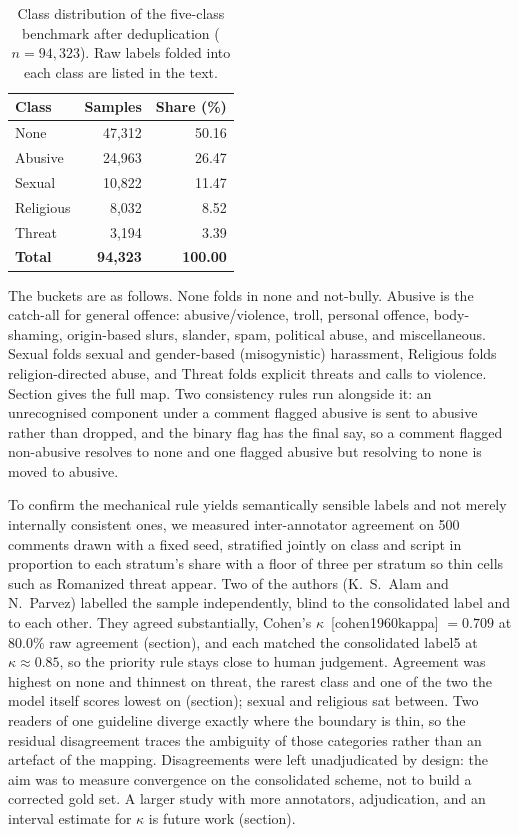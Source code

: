 \documentclass[11pt,a4paper]{article}
\def\citep#1{[#1]}%
\def\Cref#1{Section}%
\def\cref#1{section}%
\def\texttt#1{#1}%
\def\emph#1{#1}%
\begin{document}
\begin{table}[!htbp]
\centering
\caption{Class distribution of the five-class benchmark after deduplication ($n = 94{,}323$). Raw labels folded into each class are listed in the text.}
\label{tab:classes}
\small
\begin{tabular}{@{}lrr@{}}
\toprule
\textbf{Class} & \textbf{Samples} & \textbf{Share (\%)} \\
\midrule
None & 47{,}312 & 50.16 \\
Abusive & 24{,}963 & 26.47 \\
Sexual & 10{,}822 & 11.47 \\
Religious & 8{,}032 & 8.52 \\
Threat & 3{,}194 & 3.39 \\
\midrule
\textbf{Total} & \textbf{94{,}323} & \textbf{100.00} \\
\bottomrule
\end{tabular}
\end{table}

The buckets are as follows. \emph{None} folds in \texttt{none} and \texttt{not-bully}. \emph{Abusive} is the catch-all for general offence: abusive/violence, troll, personal offence, body-shaming, origin-based slurs, slander, spam, political abuse, and miscellaneous. \emph{Sexual} folds sexual and gender-based (misogynistic) harassment, \emph{Religious} folds religion-directed abuse, and \emph{Threat} folds explicit threats and calls to violence. \Cref{tab:consolidation} gives the full map. Two consistency rules run alongside it: an unrecognised component under a comment flagged abusive is sent to \emph{abusive} rather than dropped, and the binary flag has the final say, so a comment flagged non-abusive resolves to \emph{none} and one flagged abusive but resolving to \emph{none} is moved to \emph{abusive}.

To confirm the mechanical rule yields semantically sensible labels and not merely internally consistent ones, we measured inter-annotator agreement on 500 comments drawn with a fixed seed, stratified jointly on class and script in proportion to each stratum's share with a floor of three per stratum so thin cells such as Romanized \emph{threat} appear. Two of the authors (K.\ S.\ Alam and N.\ Parvez) labelled the sample independently, blind to the consolidated label and to each other. They agreed substantially, Cohen's $\kappa$~\citep{cohen1960kappa} $= 0.709$ at 80.0\% raw agreement (\cref{tab:iaa}), and each matched the consolidated \texttt{label5} at $\kappa \approx 0.85$, so the priority rule stays close to human judgement. Agreement was highest on \emph{none} and thinnest on \emph{threat}, the rarest class and one of the two the model itself scores lowest on (\cref{sec:perclass-results}); \emph{sexual} and \emph{religious} sat between. Two readers of one guideline diverge exactly where the boundary is thin, so the residual disagreement traces the ambiguity of those categories rather than an artefact of the mapping. Disagreements were left unadjudicated by design: the aim was to measure convergence on the consolidated scheme, not to build a corrected gold set. A larger study with more annotators, adjudication, and an interval estimate for $\kappa$ is future work (\cref{sec:limitations}).
\end{document}
